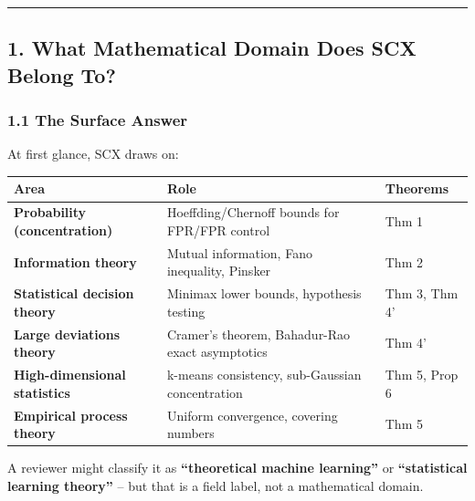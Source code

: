 \documentclass[
  12pt,
]{article}
\begin{document}
\begin{center}\rule{0.5\linewidth}{0.5pt}\end{center}

\subsection{1. What Mathematical Domain Does SCX Belong
To?}\label{what-mathematical-domain-does-scx-belong-to}

\subsubsection{1.1 The Surface Answer}\label{the-surface-answer}

At first glance, SCX draws on:

\begin{longtable}[]{@{}
  >{\raggedright\arraybackslash}p{}
  >{\raggedright\arraybackslash}p{}
  >{\raggedright\arraybackslash}p{}@{}}
\toprule\noalign{}
\begin{minipage}[b]{\linewidth}\raggedright
Area
\end{minipage} & \begin{minipage}[b]{\linewidth}\raggedright
Role
\end{minipage} & \begin{minipage}[b]{\linewidth}\raggedright
Theorems
\end{minipage} \\
\midrule\noalign{}
\endhead
\bottomrule\noalign{}
\endlastfoot
\textbf{Probability (concentration)} & Hoeffding/Chernoff bounds for
FPR/FPR control & Thm 1 \\
\textbf{Information theory} & Mutual information, Fano inequality,
Pinsker & Thm 2 \\
\textbf{Statistical decision theory} & Minimax lower bounds, hypothesis
testing & Thm 3, Thm 4' \\
\textbf{Large deviations theory} & Cramer's theorem, Bahadur-Rao exact
asymptotics & Thm 4' \\
\textbf{High-dimensional statistics} & k-means consistency, sub-Gaussian
concentration & Thm 5, Prop 6 \\
\textbf{Empirical process theory} & Uniform convergence, covering
numbers & Thm 5 \\
\end{longtable}

A reviewer might classify it as \textbf{``theoretical machine
learning''} or \textbf{``statistical learning theory''} -- but that is a
field label, not a mathematical domain.
\end{document}

